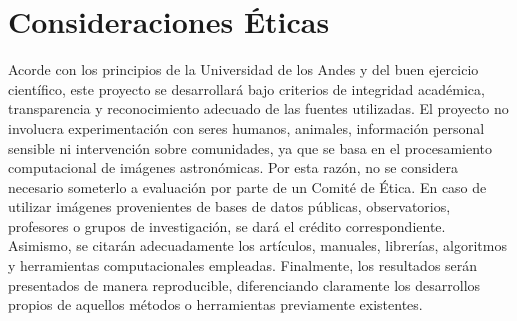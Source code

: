\documentclass[9pt]{extarticle}
\begin{document}
\section{Consideraciones Éticas}

Acorde con los principios de la Universidad de los Andes y del buen ejercicio científico, este proyecto se desarrollará bajo criterios de integridad académica, transparencia y reconocimiento adecuado de las fuentes utilizadas. El proyecto no involucra experimentación con seres humanos, animales, información personal sensible ni intervención sobre comunidades, ya que se basa en el procesamiento computacional de imágenes astronómicas. Por esta razón, no se considera necesario someterlo a evaluación por parte de un Comité de Ética. En caso de utilizar imágenes provenientes de bases de datos públicas, observatorios, profesores o grupos de investigación, se dará el crédito correspondiente. Asimismo, se citarán adecuadamente los artículos, manuales, librerías, algoritmos y herramientas computacionales empleadas. Finalmente, los resultados serán presentados de manera reproducible, diferenciando claramente los desarrollos propios de aquellos métodos o herramientas previamente existentes.
\end{document}
